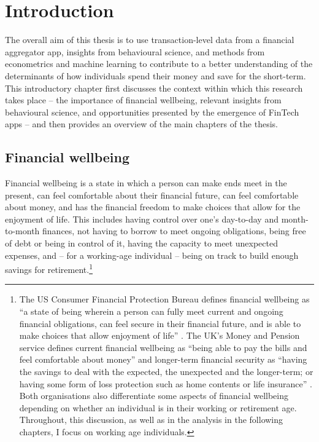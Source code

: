 
\chapter{Introduction}%
\label{cha:introduction}

The overall aim of this thesis is to use transaction-level data from a
financial aggregator app, insights from behavioural science, and methods from
econometrics and machine learning to contribute to a better understanding of
the determinants of how individuals spend their money and save for the
short-term. This introductory chapter first discusses the context within which
this research takes place -- the importance of financial wellbeing, relevant
insights from behavioural science, and opportunities presented by the emergence
of FinTech apps -- and then provides an overview of the main chapters of the
thesis.

\section{Financial wellbeing}%

Financial wellbeing is a state in which a person can make ends meet in the
present, can feel comfortable about their financial future, can feel
comfortable about money, and has the financial freedom to make choices that
allow for the enjoyment of life. This includes having control over one's
day-to-day and month-to-month finances, not having to borrow to meet
ongoing obligations, being free of debt or being in control of it, having the
capacity to meet unexpected expenses, and -- for a working-age individual --
being on track to build enough savings for retirement.\footnote{The US Consumer
    Financial Protection Bureau defines financial wellbeing as ``a state of
    being wherein a person can fully meet current and ongoing financial
    obligations, can feel secure in their financial future, and is able to make
    choices that allow enjoyment of life'' \citep{cfpb2015financial}. The UK's
    Money and Pension service defines current financial wellbeing as ``being
    able to pay the bills and feel comfortable about money'' and longer-term
    financial security as ``having the savings to deal with the expected, the
    unexpected and the longer-term; or having some form of loss protection such
    as home contents or life insurance'' \citep{mps2018building}. Both
    organisations also differentiate some aspects of financial wellbeing
    depending on whether an individual is in their working or retirement age.
Throughout, this discussion, as well as in the analysis in the following
chapters, I focus on working age individuals.}

